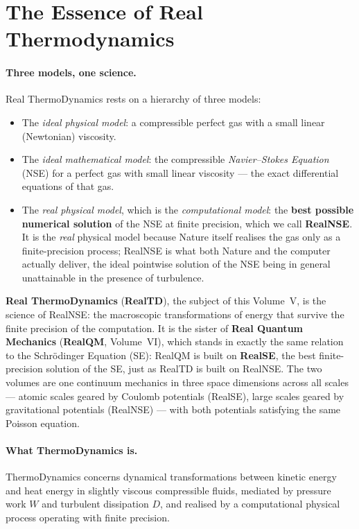 \section{The Essence of Real Thermodynamics}\label{sec:essence-realtd}

\paragraph{Three models, one science.}
Real ThermoDynamics rests on a hierarchy of three models:
\begin{itemize}
\item The \emph{ideal physical model}: a compressible perfect gas with a small
linear (Newtonian) viscosity.
\item The \emph{ideal mathematical model}: the compressible \emph{Navier--Stokes
Equation} (NSE) for a perfect gas with small linear viscosity --- the exact
differential equations of that gas.
\item The \emph{real physical model}, which is the \emph{computational model}:
the \textbf{best possible numerical solution} of the NSE at finite precision,
which we call \textbf{RealNSE}. It is the \emph{real} physical model because
Nature itself realises the gas only as a finite-precision process; RealNSE is
what both Nature and the computer actually deliver, the ideal pointwise
solution of the NSE being in general unattainable in the presence of
turbulence.
\end{itemize}
\textbf{Real ThermoDynamics} (\textbf{RealTD}), the subject of this Volume~V, is
the science of RealNSE: the macroscopic transformations of energy that survive
the finite precision of the computation. It is the sister of \textbf{Real
Quantum Mechanics} (\textbf{RealQM}, Volume~VI), which stands in exactly the same
relation to the Schr\"odinger Equation (SE): RealQM is built on \textbf{RealSE},
the best finite-precision solution of the SE, just as RealTD is built on
RealNSE. The two volumes are one continuum mechanics in three space dimensions
across all scales --- atomic scales geared by Coulomb potentials (RealSE), large
scales geared by gravitational potentials (RealNSE) --- with both potentials
satisfying the same Poisson equation.

\paragraph{What ThermoDynamics is.}
ThermoDynamics concerns dynamical transformations between kinetic
energy and heat energy in slightly viscous compressible fluids,
mediated by pressure work $W$ and turbulent dissipation $D$, and
realised by a computational physical process operating with finite
precision.

